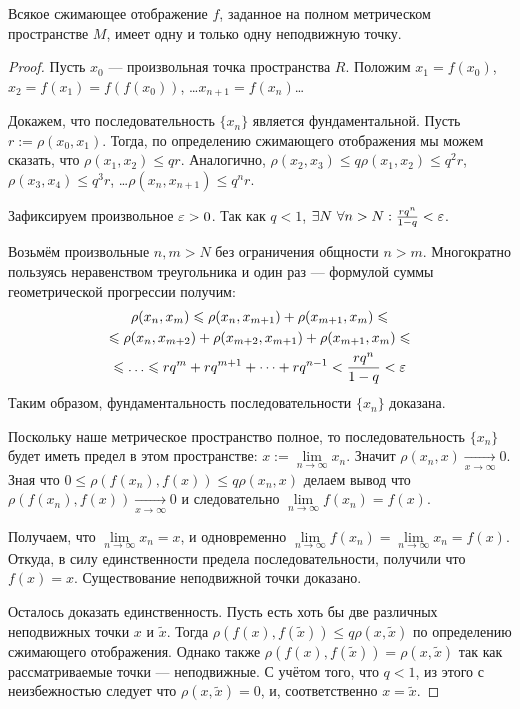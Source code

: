 \begin{Theorem}
  Всякое сжимающее отображение $f$, заданное на полном метрическом пространстве $M$, имеет одну и только одну неподвижную точку.
\end{Theorem}
\begin{proof}

Пусть $x_0$ --- произвольная точка пространства $R$. Положим $x_1 = f(x_0) $, $x_2 = f(x_1) = f(f(x_0))$, \dots $x_{n+1} = f(x_{n})$\dots

Докажем, что последовательность  $\{ x_n \} $ является фундаментальной.
Пусть $r := \rho(x_0, x_1)$.  Тогда, по определению сжимающего отображения мы можем сказать, что  $\rho(x_1, x_2) \leq qr$. Аналогично, $\rho(x_2, x_3) \leq q \rho(x_1, x_2) \leq q^2r $, $\rho(x_3, x_4) \leq q^3r $, \dots  $\rho(x_{n}, x_{n+1}) \leq q^nr$.

Зафиксируем произвольное $\varepsilon>0$. 
Так как  $q < 1 $, $\exists N\ \forall n>N: \frac{rq^n}{1-q} < \varepsilon$.

Возьмём произвольные $n, m >N$ без ограничения общности $n>m$.
Многократно пользуясь неравенством треугольника и один раз --- формулой суммы геометрической прогрессии получим:
\begin{multline}\rho(x_n, x_m) \leq \rho(x_n, x_{m+1})+\rho(x_{m+1}, x_m)\leq\\ \leq \rho(x_n, x_{m+2})+ \rho(x_{m+2}, x_{m+1})+\rho(x_{m+1}, x_m) \leq\\\leq \dots\leq rq^{m} + rq^{m+1}+\dots+rq^{n-1} < \frac{rq^n}{1-q} < \eps \end{multline}	
Таким образом, фундаментальность последовательности  $\{ x_n \} $ доказана. 


Поскольку наше метрическое пространство полное, то последовательность $\{ x_n \}$ будет иметь предел в этом пространстве: $x:= \lim\limits_{n \to \infty}x_n$.
Значит $\rho(x_{n}, x) \xrightarrow[x \to\infty]{} 0$. Зная что $0\leq\rho(f(x_{n}), f(x))\leq q \rho(x_{n}, x)$ делаем вывод что $\rho(f(x_{n}), f(x)) \xrightarrow[x \to\infty]{} 0$ и следовательно $\lim\limits_{n \to \infty}f(x_n) = f(x)$.

Получаем, что  $\lim\limits_{n \to \infty}x_n = x$, и одновременно $\lim\limits_{n \to \infty}f(x_n) = \lim\limits_{n \to \infty}x_n= f(x)$. Откуда, в силу единственности предела последовательности, получили что $f(x) = x$.
Существование неподвижной точки доказано.


Осталось доказать единственность. 
Пусть есть хоть бы две различных неподвижных точки $x$ и $\tilde{x}$.
Тогда $\rho(f(x), f(\tilde{x})) \leq q\rho(x, \tilde{x})$ по определению сжимающего отображения. Однако также $\rho(f(x), f(\tilde{x})) = \rho(x, \tilde{x})$ так как рассматриваемые точки --- неподвижные. С учётом того, что $q<1$, из этого с неизбежностью следует что $\rho(x, \tilde{x}) = 0$, и, соответственно $x = \tilde{x}$.

\end{proof}

